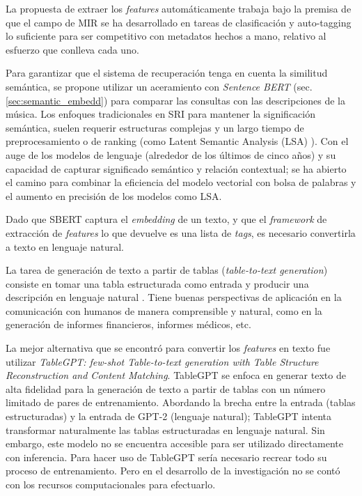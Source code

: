 La propuesta de extraer los \textit{features} automáticamente trabaja bajo la premisa de que el campo de MIR se ha desarrollado en tareas de clasificación y auto-tagging lo suficiente para ser competitivo con metadatos hechos a mano, relativo al esfuerzo que conlleva cada uno. %

Para garantizar que el sistema de recuperación tenga en cuenta la similitud semántica, se propone utilizar un aceramiento con \textit{Sentence BERT} (sec. \ref{sec:semantic_embedd}) para comparar las consultas con las descripciones de la música. Los enfoques tradicionales en SRI para mantener la significación semántica, suelen requerir estructuras complejas y un largo tiempo de preprocesamiento o de ranking (como Latent Semantic Analysis (LSA) \cite{Foltz1996LatentSA}). Con el auge de los modelos de lenguaje (alrededor de los últimos de cinco años) y su capacidad de capturar significado semántico y relación contextual; se ha abierto el camino para combinar la eficiencia del modelo vectorial con bolsa de palabras y el aumento en precisión de los modelos como LSA. 

Dado que SBERT captura el \textit{embedding} de un texto, y que el \textit{framework} de extracción de \textit{features} lo que devuelve es una lista de \textit{tags}, es necesario convertirla a texto en lenguaje natural.  

La tarea de generación de texto a partir de tablas (\textit{table-to-text generation}) consiste en tomar una tabla estructurada como entrada y producir una descripción en lenguaje natural \cite{Yang2021TableTT}. Tiene buenas perspectivas de aplicación en la comunicación con humanos de manera comprensible y natural, como en la generación de informes financieros, informes médicos, etc. 

La mejor alternativa que se encontró para convertir los \textit{features} en texto fue utilizar \textit{TableGPT: few-shot Table-to-text generation with Table Structure Reconstruction and Content Matching}. TableGPT \cite{Gong2020TableGPTFT} se enfoca en generar texto de alta fidelidad para la generación de texto a partir de tablas con un número limitado de pares de entrenamiento. Abordando la brecha entre la entrada (tablas estructuradas) y la entrada de GPT-2 (lenguaje natural); TableGPT intenta transformar naturalmente las tablas estructuradas en lenguaje natural. Sin embargo, este modelo no se encuentra accesible para ser utilizado directamente con inferencia. Para hacer uso de TableGPT sería necesario recrear todo su proceso de entrenamiento. Pero en el desarrollo de la investigación no se contó con los recursos computacionales para efectuarlo.

